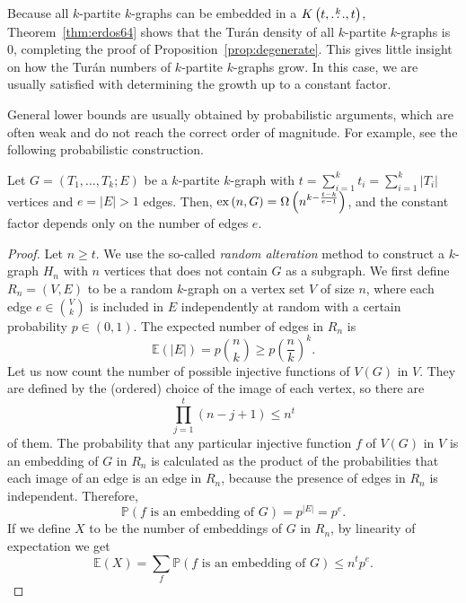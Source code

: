Because all $k$-partite $k$-graphs can be embedded in a $K\left(t, \overset{k}{\dots}, t\right)$,
Theorem~\ref{thm:erdos64} shows that the Turán density of all $k$-partite $k$-graphs is $0$,
completing the proof of Proposition~\ref{prop:degenerate}.
This gives little insight on how the Turán numbers of $k$-partite $k$-graphs grow.
In this case, we are usually satisfied with determining the growth up to a constant factor.

General lower bounds are usually obtained by probabilistic arguments,
which are often weak and do not reach the correct order of magnitude.
For example, see the following probabilistic construction.

\begin{proposition} \label{prop:probabilistic-lower-bound}
    Let $G = (T_1, \dots, T_k; E)$ be a $k$-partite $k$-graph with
    $t = \sum_{i=1}^{k} t_i = \sum_{i=1}^{k} |T_i|$ vertices
    and $e = |E| > 1$ edges.
    Then, $\text{ex} \left( n, G \right) = \Omega\left(n^{k - \frac{t - k}{e - 1}} \right)$, and the
    constant factor depends only on the number of edges $e$.
    \begin{proof}
        Let $n \geq t$.
        We use the so-called \emph{random alteration} method to construct a $k$-graph
        $H_n$ with $n$ vertices that does not contain $G$ as a subgraph.
        We first define $R_n = (V, E)$ to be a random $k$-graph on a vertex set $V$ of size $n$,
        where each edge $e \in \binom{V}{k}$ is included in $E$ independently at random
        with a certain probability $p \in (0, 1)$.
        The expected number of edges in $R_n$ is
        \[
            \mathbb{E}(|E|) = p \binom{n}{k} \geq p \left( \frac{n}{k} \right)^k.
        \]
        Let us now count the number of possible injective functions of $V(G)$ in $V$.
        They are defined by the (ordered) choice of the image of each vertex, so there are
        \[
            \prod_{j=1}^{t} (n - j + 1) \leq n^t
        \]
        of them.
        The probability that any particular injective function $f$ of $V(G)$ in $V$ is an embedding of $G$ in $R_n$
        is calculated as the product of the probabilities that each image of an edge is an edge in $R_n$,
        because the presence of edges in $R_n$ is independent.
        Therefore,
        \[
            \mathbb{P}(f \text{ is an embedding of } G) = p^{|E|} = p^{e}.
        \]
        If we define $X$ to be the number of embeddings of $G$ in $R_n$, by linearity of expectation we get
        \[
            \mathbb{E}(X) = \sum_{f} \mathbb{P}(f \text{ is an embedding of } G) \leq n^t p^{e}.
        \]

\end{proof}
\end{proposition}
